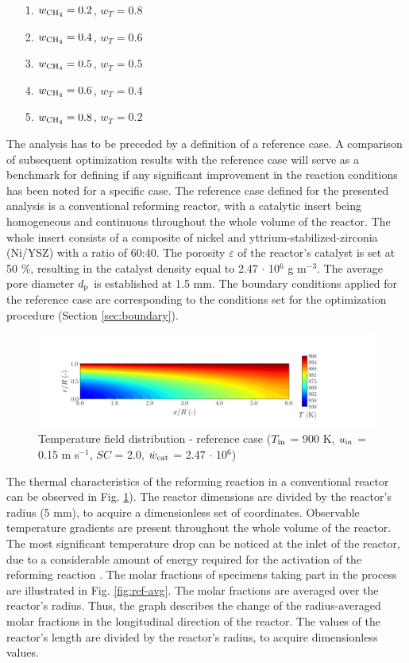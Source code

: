 \documentclass[preprint,12pt]{elsarticle}
\begin{document}
\begin{itemize}
\item[1.] {$w_{\rm{CH_4}}  = 0.2$, $w_{T}  = 0.8$ }
\item[2.] {$w_{\rm{CH_4}}  = 0.4$, $w_{T}  = 0.6$ }
\item[3.] {$w_{\rm{CH_4}}  = 0.5$, $w_{T}  = 0.5$ }
\item[4.] {$w_{\rm{CH_4}}  = 0.6$, $w_{T}  = 0.4$ }
\item[5.] {$w_{\rm{CH_4}}  = 0.8$, $w_{T}  = 0.2$ }
\end{itemize}

The analysis has to be preceded by a definition of a reference case. A comparison of subsequent optimization results with the reference case will serve as a benchmark for defining if any significant improvement in the reaction conditions has been noted for a specific case. The reference case defined for the presented analysis is a conventional reforming reactor, with a catalytic insert being homogeneous and continuous throughout the whole volume of the reactor. The whole insert consists of a composite of nickel and yttrium-stabilized-zirconia (Ni/YSZ) with a ratio of 60:40. The porosity $\varepsilon$ of the reactor's catalyst is set at 50 \%, resulting in the catalyst density equal to 2.47 $\cdot$ 10$^6$ g m$^{-3}$. The average pore diameter $d_{\rm{p}}$ is established at 1.5 mm. The boundary conditions applied for the reference case are corresponding to the conditions set for the optimization procedure (Section \ref{sec:boundary}).

\begin{figure}[h]
\centering
\includegraphics[width=190mm]{ref-Tfield.png}
\caption{\label{fig:ref-TField} Temperature field distribution - reference case ($T_{\rm{in}}$ = 900 K, $u_{\rm{in}}$ = 0.15 m s$^{-1}$, $SC$ = 2.0, $\dot{w}_{\rm{cat}}$ = 2.47 $\cdot$ 10$^{6}$)}
\end{figure}

The thermal characteristics of the reforming reaction in a conventional reactor can be observed in Fig. \ref{fig:ref-TField}). The reactor dimensions are divided by the reactor's radius (5 mm), to acquire a dimensionless set of coordinates. Observable temperature gradients are present throughout the whole volume of the reactor. The most significant temperature drop can be noticed at the inlet of the reactor, due to a considerable amount of energy required for the activation of the reforming reaction \cite{Xu1989, Pajak2018}. The molar fractions of specimens taking part in the process are illustrated in Fig. \ref{fig:ref-avg}. The molar fractions are averaged over the reactor's radius. Thus, the graph describes the change of the radius-averaged molar fractions in the longitudinal direction of the reactor. The values of the reactor's length are divided by the reactor's radius, to acquire dimensionless values.  
\end{document}
